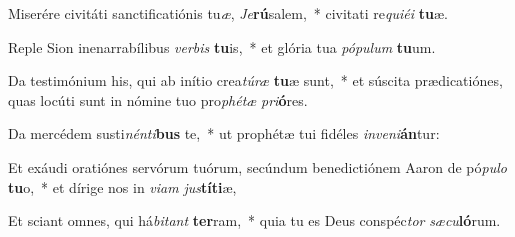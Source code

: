 \item Miserére civitáti sanctificatiónis tu\textit{æ}, \textit{Je}\textbf{rú}salem,~* civitati re\textit{qui}\textit{é}\textit{i} \textbf{tu}æ.
\item Reple Sion inenarrabílibus \textit{ver}\textit{bis} \textbf{tu}is,~* et glória tua \textit{pó}\textit{pu}\textit{lum} \textbf{tu}um.
\item Da testimónium his, qui ab inítio crea\textit{tú}\textit{ræ} \textbf{tu}æ sunt,~* et súscita prædicatiónes, quas locúti sunt in nómine tuo pro\textit{phé}\textit{tæ} \textit{pri}\textbf{ó}res.
\item Da mercédem susti\textit{nén}\textit{ti}\textbf{bus} te,~* ut prophétæ tui fidéles \textit{in}\textit{ve}\textit{ni}\textbf{án}tur:
\item Et exáudi oratiónes servórum tuórum, secúndum benedictiónem Aaron de pó\textit{pu}\textit{lo} \textbf{tu}o,~* et dírige nos in \textit{vi}\textit{am} \textit{jus}\textbf{tí}\textbf{ti}æ,
\item Et sciant omnes, qui há\textit{bi}\textit{tant} \textbf{ter}ram,~* quia tu es Deus conspéc\textit{tor} \textit{sæ}\textit{cu}\textbf{ló}rum.
